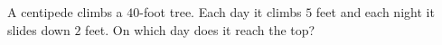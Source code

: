 A centipede climbs a $40$-foot tree. Each day it climbs $5$ feet and each night it slides down $2$ feet. On which day does it reach the top?
